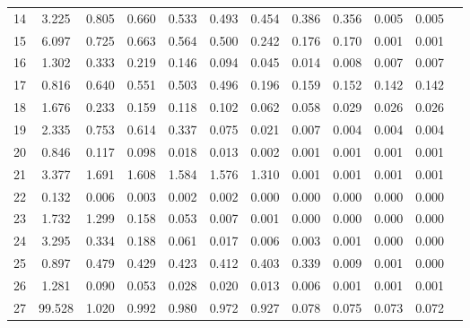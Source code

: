 \begin{table}[!h]
{\begin{tabular}{|c|cccccccccc|c|}
14 & 3.225 & 0.805 & 0.660 & 0.533 & 0.493 & 0.454 & 0.386 & 0.356 & 0.005 & 0.005 \\
15 & 6.097 & 0.725 & 0.663 & 0.564 & 0.500 & 0.242 & 0.176 & 0.170 & 0.001 & 0.001 \\
16 & 1.302 & 0.333 & 0.219 & 0.146 & 0.094 & 0.045 & 0.014 & 0.008 & 0.007 & 0.007 \\
17 & 0.816 & 0.640 & 0.551 & 0.503 & 0.496 & 0.196 & 0.159 & 0.152 & 0.142 & 0.142 \\
18 & 1.676 & 0.233 & 0.159 & 0.118 & 0.102 & 0.062 & 0.058 & 0.029 & 0.026 & 0.026 \\
19 & 2.335 & 0.753 & 0.614 & 0.337 & 0.075 & 0.021 & 0.007 & 0.004 & 0.004 & 0.004 \\
20 & 0.846 & 0.117 & 0.098 & 0.018 & 0.013 & 0.002 & 0.001 & 0.001 & 0.001 & 0.001 \\
21 & 3.377 & 1.691 & 1.608 & 1.584 & 1.576 & 1.310 & 0.001 & 0.001 & 0.001 & 0.001 \\
22 & 0.132 & 0.006 & 0.003 & 0.002 & 0.002 & 0.000 & 0.000 & 0.000 & 0.000 & 0.000 \\
23 & 1.732 & 1.299 & 0.158 & 0.053 & 0.007 & 0.001 & 0.000 & 0.000 & 0.000 & 0.000 \\
24 & 3.295 & 0.334 & 0.188 & 0.061 & 0.017 & 0.006 & 0.003 & 0.001 & 0.000 & 0.000 \\
25 & 0.897 & 0.479 & 0.429 & 0.423 & 0.412 & 0.403 & 0.339 & 0.009 & 0.001 & 0.000 \\
26 & 1.281 & 0.090 & 0.053 & 0.028 & 0.020 & 0.013 & 0.006 & 0.001 & 0.001 & 0.001 \\
27 & 99.528 & 1.020 & 0.992 & 0.980 & 0.972 & 0.927 & 0.078 & 0.075 & 0.073 & 0.072 \\
\hline
\end{tabular}
}
\end{table}



